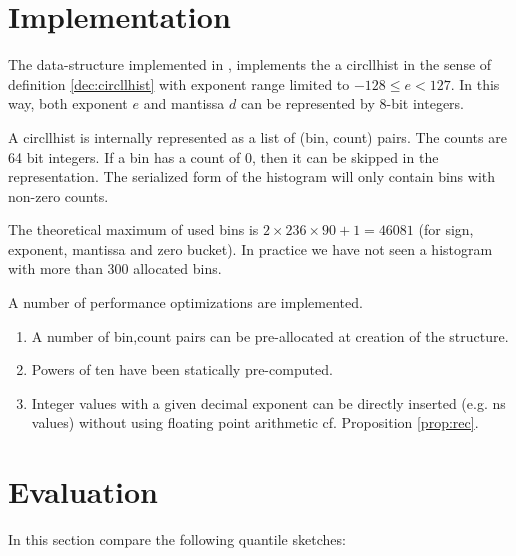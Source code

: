 \documentclass{article}
\theoremstyle{plain}
\theoremstyle{remark}
\begin{document}
\section{Implementation}

The data-structure implemented in \cite{libcircllhist}, implements the a circllhist in the sense of
definition \ref{dec:circllhist} with exponent range limited to $-128 \leq e < 127$.
In this way, both exponent $e$ and mantissa $d$ can be represented by 8-bit integers.

A circllhist is internally represented as a list of (bin, count) pairs.
The counts are 64 bit integers.
If a bin has a count of 0, then it can be skipped in the representation.
The serialized form of the histogram will only contain bins with non-zero counts.

The theoretical maximum of used bins is $2 \times 236 \times 90 + 1 = 46081$
(for sign, exponent, mantissa and zero bucket).
In practice we have not seen a histogram with more than 300 allocated bins.

A number of performance optimizations are implemented.

\begin{enumerate}
\item A number of bin,count pairs can be pre-allocated at creation of the structure.
\item Powers of ten have been statically pre-computed.
\item Integer values with a given decimal exponent can be directly inserted (e.g. ns values) without
  using floating point arithmetic cf. Proposition \ref{prop:rec}.
\end{enumerate}


\section{Evaluation}
\label{sec:eval}

In this section compare the following quantile sketches:
\end{document}
